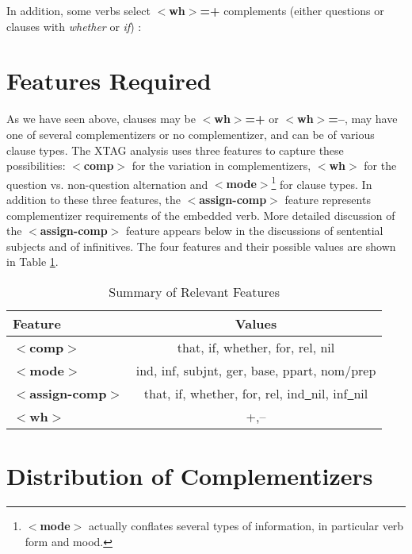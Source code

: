 In addition, some verbs select {\bf $<$wh$>$=+} complements (either questions
or clauses with {\it whether} or {\it if}) \cite{grimshaw90}:


\section{Features Required}
\label{s-features}

As we have seen above, clauses may be {\bf $<$wh$>$=+} or {\bf $<$wh$>$=--},
may have one of several complementizers or no complementizer, and can be of
various clause types.  The XTAG analysis uses three features to capture these
possibilities: {\bf $<$comp$>$} for the variation in complementizers,
{\bf$<$wh$>$} for the question vs.  non-question alternation and {\bf
$<$mode$>$}\footnote{{\bf $<$mode$>$} actually conflates several types of
information, in particular verb form and mood.} for clause types.  In addition
to these three features, the {\bf $<$assign-comp$>$} feature represents
complementizer requirements of the embedded verb.  More detailed discussion of
the {\bf $<$assign-comp$>$} feature appears below in the discussions of
sentential subjects and of infinitives.  The four features and their possible
values are shown in Table \ref{feat}.


\begin{table}[th]
\centering
\begin{tabular}{|l|c|} \hline
Feature&Values\\
\hline
{\bf $<$comp$>$}&that, if, whether, for, rel, nil\\
\hline
{\bf$<$mode$>$}&ind, inf, subjnt, ger, base, ppart, nom/prep\\
\hline
{\bf$<$assign-comp$>$}&that, if, whether, for, rel, ind\underline{~}nil, inf\underline{~}nil\\
\hline
{\bf$<$wh$>$}&+,--\\
\hline
\end{tabular}
\caption{Summary of Relevant Features}
\label{feat}
\end{table}


\section{Distribution of Complementizers}
\label{comp-distr}

